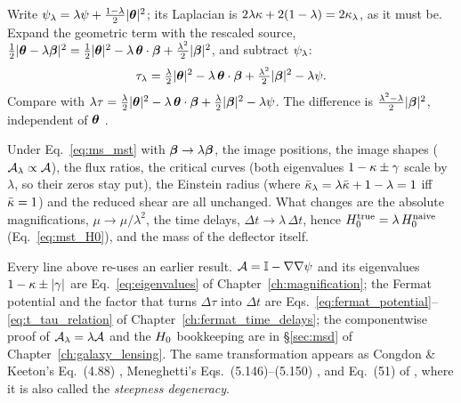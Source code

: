 \begin{derivation}
Write $\psi_\lambda=\lambda\psi+\tfrac{1-\lambda}{2}|\boldsymbol{\theta}|^2$; its
Laplacian is $2\lambda\kappa+2(1-\lambda)=2\kappa_\lambda$, as it must be.
Expand the geometric term with the rescaled source,
$\tfrac12|\boldsymbol{\theta}-\lambda\boldsymbol{\beta}|^2
=\tfrac12|\boldsymbol{\theta}|^2-\lambda\,\boldsymbol{\theta}\cdot\boldsymbol{\beta}+\tfrac{\lambda^2}{2}|\boldsymbol{\beta}|^2$,
and subtract $\psi_\lambda$:
\[
\tau_\lambda=\tfrac{\lambda}{2}|\boldsymbol{\theta}|^2-\lambda\,\boldsymbol{\theta}\cdot\boldsymbol{\beta}
+\tfrac{\lambda^2}{2}|\boldsymbol{\beta}|^2-\lambda\psi .
\]
Compare with
$\lambda\tau=\tfrac{\lambda}{2}|\boldsymbol{\theta}|^2-\lambda\,\boldsymbol{\theta}\cdot\boldsymbol{\beta}
+\tfrac{\lambda}{2}|\boldsymbol{\beta}|^2-\lambda\psi$.
The difference is $\tfrac{\lambda^2-\lambda}{2}|\boldsymbol{\beta}|^2$, independent of
$\boldsymbol{\theta}$ .
\end{derivation}

\begin{keybox}
Under Eq.~\eqref{eq:ms_mst} with $\boldsymbol{\beta}\to\lambda\boldsymbol{\beta}$, the image
positions, the image shapes ($\mathcal{A}_\lambda\propto\mathcal{A}$), the flux ratios,
the critical curves (both eigenvalues $1-\kappa\pm\gamma$ scale by
$\lambda$, so their zeros stay put), the Einstein radius (where
$\bar{\kappa}_\lambda=\lambda\bar{\kappa}+1-\lambda=1$ iff $\bar{\kappa}=1$)
and the reduced shear are all unchanged.  What changes are the absolute
magnifications, $\mu\to\mu/\lambda^2$, the time delays,
$\Delta t\to\lambda\,\Delta t$, hence
$H_0^{\rm true}=\lambda\,H_0^{\rm naive}$ (Eq.~\ref{eq:mst_H0}),
and the mass of the deflector itself.
\end{keybox}

\begin{bridge}
Every line above re-uses an earlier result.  $\mathcal{A}=\mathbb{I}-\nabla\nabla\psi$ and its
eigenvalues $1-\kappa\pm|\gamma|$ are Eq.~\eqref{eq:eigenvalues} of
Chapter~\ref{ch:magnification}; the Fermat potential and the factor that turns
$\Delta\tau$ into $\Delta t$ are
Eqs.~\eqref{eq:fermat_potential}--\eqref{eq:t_tau_relation} of
Chapter~\ref{ch:fermat_time_delays}; the componentwise proof of
$\mathcal{A}_\lambda=\lambda\mathcal{A}$ and the $H_0$ bookkeeping are in
\S\ref{sec:msd} of Chapter~\ref{ch:galaxy_lensing}.  The same transformation
appears as Congdon \& Keeton's Eq.~(4.88) \citep{congdon_principles_2018},
Meneghetti's Eqs.~(5.146)--(5.150) \citep{meneghetti_introduction_2021}, and
Eq.~(51) of \citet{saha_essentials_2024}, where it is also called the
\emph{steepness degeneracy}.
\end{bridge}

